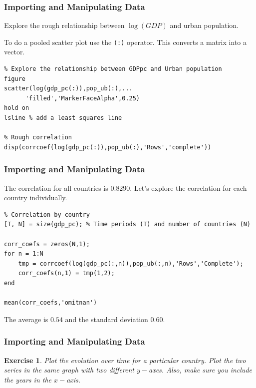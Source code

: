 \documentclass[11pt,xcolor={svgnames},aspectratio=169,usepdftitle=false]{beamer}
\let\toneitemize\itemize
\let\ttwoitemize\enditemize
\renewenvironment{itemize}{\toneitemize\addtolength{\itemsep}{0.7\baselineskip}}{\ttwoitemize}
\newtheorem{exercise}{Exercise}
\begin{document}
\begin{frame}[fragile]
  \frametitle{Importing and Manipulating Data}
\begin{itemize}
  \item Explore the rough relationship between $\log(GDP)$ and urban population.
  \item To do a pooled scatter plot use the \verb;(:); operator. This converts a matrix into a vector.
\end{itemize}
\begin{lstlisting}
% Explore the relationship between GDPpc and Urban population
figure
scatter(log(gdp_pc(:)),pop_ub(:),...
      'filled','MarkerFaceAlpha',0.25)
hold on
lsline % add a least squares line

% Rough correlation
disp(corrcoef(log(gdp_pc(:)),pop_ub(:),'Rows','complete'))
\end{lstlisting}
\end{frame}

\begin{frame}[fragile]
  \frametitle{Importing and Manipulating Data}
\begin{itemize}
  \item The correlation for all countries is $0.8290$. Let's explore the correlation for each country individually.
\end{itemize}
\begin{lstlisting}
% Correlation by country
[T, N] = size(gdp_pc); % Time periods (T) and number of countries (N)

corr_coefs = zeros(N,1);
for n = 1:N
    tmp = corrcoef(log(gdp_pc(:,n)),pop_ub(:,n),'Rows','Complete');
    corr_coefs(n,1) = tmp(1,2);
end

mean(corr_coefs,'omitnan')
\end{lstlisting}
\begin{itemize}
  \item The average is $0.54$ and the standard deviation $0.60$.
\end{itemize}
\end{frame}

\begin{frame}[fragile]
  \frametitle{Importing and Manipulating Data}
\begin{exercise}
Plot the evolution over time for a particular country. Plot the two series in the same graph with two different $y-$axes. Also, make sure you include the years in the $x-$axis.
\end{exercise}
\end{frame}
\end{document}
